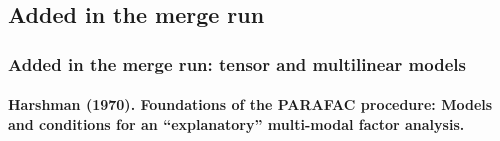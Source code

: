 \documentclass[journal,onecolumn]{IEEEtran}
\begin{document}
\subsection{Added in the merge run}

\subsubsection{Added in the merge run: tensor and multilinear models}

\paragraph{Harshman (1970). Foundations of the PARAFAC procedure: Models and conditions for an ``explanatory'' multi-modal factor analysis.~\cite{Harshman1970Foundations}}\mbox{}
\end{document}
